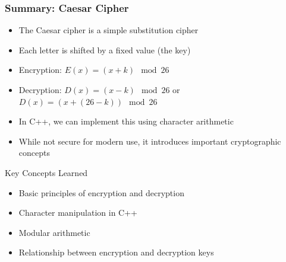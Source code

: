 \documentclass{beamer}
\begin{document}
\begin{frame}
    \frametitle{Summary: Caesar Cipher}
    
    \begin{itemize}
        \item The Caesar cipher is a simple substitution cipher
        \item Each letter is shifted by a fixed value (the key)
        \item Encryption: $E(x) = (x + k) \mod 26$
        \item Decryption: $D(x) = (x - k) \mod 26$ or $D(x) = (x + (26-k)) \mod 26$
        \item In C++, we can implement this using character arithmetic
        \item While not secure for modern use, it introduces important cryptographic concepts
    \end{itemize}
    
    \begin{block}{Key Concepts Learned}
        \begin{itemize}
            \item Basic principles of encryption and decryption
            \item Character manipulation in C++
            \item Modular arithmetic
            \item Relationship between encryption and decryption keys
        \end{itemize}
    \end{block}
\end{frame}
\end{document}

